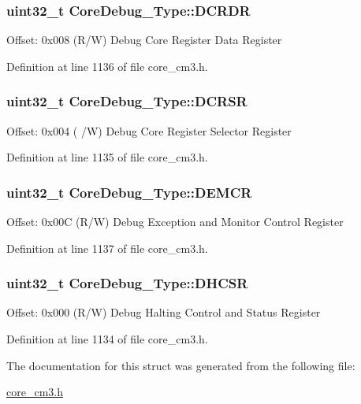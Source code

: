 \subsubsection[{\texorpdfstring{D\+C\+R\+DR}{DCRDR}}]{ uint32\+\_\+t Core\+Debug\+\_\+\+Type\+::\+D\+C\+R\+DR}\hypertarget{structCoreDebug__Type_ab8f4bb076402b61f7be6308075a789c9}{}\label{structCoreDebug__Type_ab8f4bb076402b61f7be6308075a789c9}
Offset\+: 0x008 (R/W) Debug Core Register Data Register 

Definition at line 1136 of file core\+\_\+cm3.\+h.

\subsubsection[{\texorpdfstring{D\+C\+R\+SR}{DCRSR}}]{ uint32\+\_\+t Core\+Debug\+\_\+\+Type\+::\+D\+C\+R\+SR}\hypertarget{structCoreDebug__Type_afefa84bce7497652353a1b76d405d983}{}\label{structCoreDebug__Type_afefa84bce7497652353a1b76d405d983}
Offset\+: 0x004 ( /W) Debug Core Register Selector Register 

Definition at line 1135 of file core\+\_\+cm3.\+h.

\subsubsection[{\texorpdfstring{D\+E\+M\+CR}{DEMCR}}]{ uint32\+\_\+t Core\+Debug\+\_\+\+Type\+::\+D\+E\+M\+CR}\hypertarget{structCoreDebug__Type_a5cdd51dbe3ebb7041880714430edd52d}{}\label{structCoreDebug__Type_a5cdd51dbe3ebb7041880714430edd52d}
Offset\+: 0x00C (R/W) Debug Exception and Monitor Control Register 

Definition at line 1137 of file core\+\_\+cm3.\+h.

\subsubsection[{\texorpdfstring{D\+H\+C\+SR}{DHCSR}}]{ uint32\+\_\+t Core\+Debug\+\_\+\+Type\+::\+D\+H\+C\+SR}\hypertarget{structCoreDebug__Type_a25c14c022c73a725a1736e903431095d}{}\label{structCoreDebug__Type_a25c14c022c73a725a1736e903431095d}
Offset\+: 0x000 (R/W) Debug Halting Control and Status Register 

Definition at line 1134 of file core\+\_\+cm3.\+h.



The documentation for this struct was generated from the following file\+:\begin{DoxyCompactItemize}
\item 
\hyperlink{core__cm3_8h}{core\+\_\+cm3.\+h}\end{DoxyCompactItemize}

